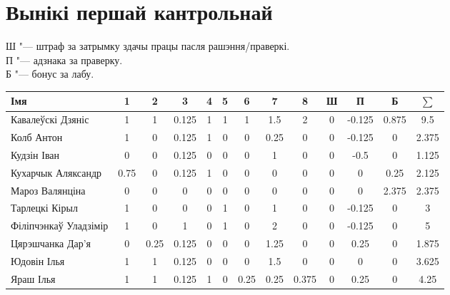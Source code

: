 

\geometry{left=1.5cm}
\renewcommand\thempfootnote{\arabic{mpfootnote}}


	\section{Вынікі першай кантрольнай}
	\noindent Ш "--- штраф за затрымку здачы працы пасля рашэння/праверкі. \\
	П "--- адзнака за праверку. \\
	Б "--- бонус за лабу.
\begin{table}[H]
    \begin{tabular}{|l|c|c|c|c|c|c|c|c|c|c|c|c|}
        \hline
   		Імя                   &  1   &  2   &   3   & 4 & 5 &  6   &  7   &   8   & Ш &   П    &   Б   & $\sum$ \\ \hline
   		Кавалеўскі Дзяніс     &  1   &  1   & 0.125 & 1 & 1 &  1   &  1.5 &   2   & 0 & -0.125 & 0.875 &   9.5  \\ \hline
   		Колб Антон            &  1   &  0   & 0.125 & 1 & 0 &  0   & 0.25 &   0   & 0 & -0.125 &   0   &  2.375 \\ \hline
   		Кудзін Іван           &  0   &  0   & 0.125 & 0 & 0 &  0   &  1   &   0   & 0 &  -0.5  &   0   &  1.125 \\ \hline
   		Кухарчык Аляксандр    & 0.75 &  0   & 0.125 & 1 & 0 &  0   &  0   &   0   & 0 &   0    &  0.25 &  2.125 \\ \hline
   		Мароз Валянціна       &  0   &  0   &   0   & 0 & 0 &  0   &  0   &   0   & 0 &   0    & 2.375 &  2.375 \\ \hline
   		Тарлецкі Кірыл        &  1   &  0   &   0   & 0 & 1 &  0   &  1   &   0   & 0 & -0.125 &   0   &   3    \\ \hline
   		Філіпчэнкаў Уладзімір &  1   &  0   &   1   & 0 & 1 &  0   &  2   &   0   & 0 & -0.125 &   0   &   5    \\ \hline
   		Цярэшчанка Дар'я      &  0   & 0.25 & 0.125 & 0 & 0 &  0   & 1.25 &   0   & 0 &  0.25  &   0   &  1.875 \\ \hline
   		Юдовін Ілья           &  1   &  1   & 0.125 & 0 & 0 &  0   &  1.5 &   0   & 0 &   0    &   0   &  3.625 \\ \hline
   		Яраш Ілья             &  1   &  1   & 0.125 & 1 & 0 & 0.25 & 0.25 & 0.375 & 0 &  0.25  &   0   &  4.25  \\ \hline
	\end{tabular}
\end{table}


